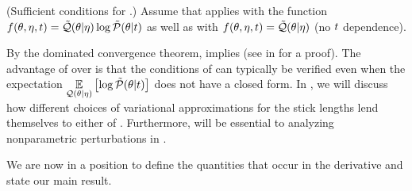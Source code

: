 %
\begin{assu}
(Sufficient conditions for .)
%
Assume that  applies with the function $f(\theta,
\eta, t) = \tilde{\mathcal{Q}}(\theta \vert \eta) \log \tilde{\mathcal{P}}(\theta \vert t)$ as well as
with $f(\theta, \eta, t) = \tilde{\mathcal{Q}}(\theta \vert \eta)$ (no $t$ dependence).
%
\end{assu}

By the dominated convergence theorem,  implies
 (see  in  for a
proof). The advantage of  over
 is that the conditions of 
can typically be verified even when the expectation $\underset{\mathcal{Q}(\theta \vert
\eta)}{\mathbb{E}}\left[\log \tilde{\mathcal{P}}(\theta \vert t)\right]$ does not have a closed form.  In
, we will discuss how different choices of
variational approximations for the stick lengths lend themselves to either
 of .  Furthermore,
 will be essential to analyzing nonparametric
perturbations in .

We are now in a position to define the quantities that occur in the derivative
and state our main result.

